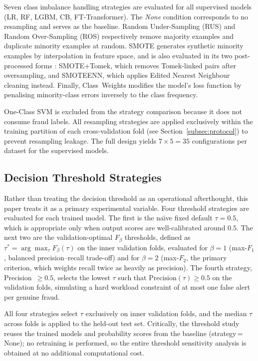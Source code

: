 \documentclass[a4paper,fleqn]{cas-sc}
\begin{document}
Seven class imbalance handling strategies are evaluated for all supervised models (LR,
RF, LGBM, CB, FT-Transformer). The \emph{None} condition corresponds to no resampling
and serves as the baseline. Random Under-Sampling (RUS) and Random Over-Sampling (ROS)
respectively remove majority examples and duplicate minority examples at random.
SMOTE \citep{chawla2002smote} generates synthetic minority examples by interpolation in
feature space, and is also evaluated in its two post-processed forms
\citep{batista2004balancing}: SMOTE+Tomek, which removes Tomek-linked pairs after
oversampling, and SMOTEENN, which applies Edited Nearest Neighbour cleaning instead.
Finally, Class~Weights modifies the model's loss function by penalising minority-class
errors inversely to the class frequency.

One-Class SVM is excluded from the strategy comparison because it does not consume
fraud labels. All resampling strategies are applied exclusively within the training
partition of each cross-validation fold (see Section~\ref{subsec:protocol}) to prevent
resampling leakage. The full design yields $7 \times 5 = 35$ configurations per dataset
for the supervised models.

\subsection{Decision Threshold Strategies}
\label{subsec:threshold}

Rather than treating the decision threshold as an operational afterthought, this paper
treats it as a primary experimental variable. Four threshold strategies are evaluated
for each trained model. The first is the na\"{\i}ve fixed default $\tau=0.5$, which is
appropriate only when output scores are well-calibrated around $0.5$. The next two are
the validation-optimal $F_\beta$ thresholds, defined as
$\tau^{*} = \arg\max_{\tau} F_{\beta}(\tau)$ on the inner validation folds, evaluated
for $\beta=1$ (max-$F_1$, balanced precision--recall trade-off) and for $\beta=2$
(max-$F_2$, the primary criterion, which weights recall twice as heavily as precision).
The fourth strategy, Precision~$\geq 0.5$, selects the lowest $\tau$ such that
$\text{Precision}(\tau) \geq 0.5$ on the validation folds, simulating a hard workload
constraint of at most one false alert per genuine fraud.

All four strategies select $\tau$ exclusively on inner validation folds, and the
median $\tau$ across folds is applied to the held-out test set. Critically, the
threshold study reuses the trained models and probability scores from the baseline
(strategy\,=\,None); no retraining is performed, so the entire threshold sensitivity
analysis is obtained at no additional computational cost.
\end{document}
